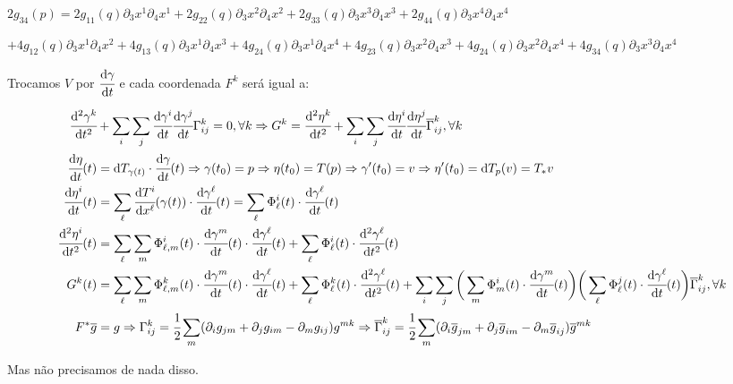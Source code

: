 		$2 g_{34}(p) = 2 g_{11}(q) \partial_3 x^1 \partial_4 x^1 + 2 g_{22}(q) \partial_3 x^2 \partial_4 x^2 + 2 g_{33}(q) \partial_3 x^3 \partial_4 x^3 + 2 g_{44}(q) \partial_3 x^4 \partial_4 x^4$

		$+ 4 g_{12}(q) \partial_3 x^1 \partial_4 x^2 + 4 g_{13}(q) \partial_3 x^1 \partial_4 x^3 + 4 g_{24}(q) \partial_3 x^1 \partial_4 x^4 + 4 g_{23}(q) \partial_3 x^2 \partial_4 x^3 + 4 g_{24}(q) \partial_3 x^2 \partial_4 x^4 + 4 g_{34}(q) \partial_3 x^3 \partial_4 x^4$

		Trocamos $V$ por $\cfrac{\mathrm{d} \gamma}{\mathrm{d} t}$ e cada coordenada $F^k$ ser\'a igual a:

		\begin{align*}
		  \cfrac{\mathrm{d}^2 \gamma^k}{\mathrm{d} t^2} &+ \sum_i \sum_j \cfrac{\mathrm{d} \gamma^i}{\mathrm{d} t} \cfrac{\mathrm{d} \gamma^j}{\mathrm{d} t} \Gamma_{ij}^k = 0, \forall k \Rightarrow G^k = \cfrac{\mathrm{d}^2 \eta^k}{\mathrm{d} t^2} + \sum_i \sum_j \cfrac{\mathrm{d} \eta^i}{\mathrm{d} t} \cfrac{\mathrm{d} \eta^j}{\mathrm{d} t} \overline{\Gamma}_{ij}^k, \forall k \\
		  \cfrac{\mathrm{d} \eta}{\mathrm{d} t} (t) &= \mathrm{d}T_{\gamma(t)} \cdot \cfrac{\mathrm{d} \gamma}{\mathrm{d} t} (t) \Rightarrow \gamma(t_0) = p \Rightarrow \eta(t_0) = T(p) \Rightarrow \gamma'(t_0) = v \Rightarrow \eta'(t_0) = \mathrm{d}T_p (v) = T_* v  \\
		  \cfrac{\mathrm{d} \eta^i}{\mathrm{d} t} (t) &= \sum_\ell \cfrac{\mathrm{d}T^i}{\mathrm{d}x^\ell} (\gamma(t)) \cdot \cfrac{\mathrm{d} \gamma^\ell}{\mathrm{d} t} (t) = \sum_\ell \Phi_\ell^i(t) \cdot \cfrac{\mathrm{d} \gamma^\ell}{\mathrm{d} t} (t) \\
		  \cfrac{\mathrm{d}^2 \eta^i}{\mathrm{d} t^2} (t) &= \sum_\ell \sum_m \Phi_{\ell, m}^i(t) \cdot \cfrac{\mathrm{d} \gamma^m}{\mathrm{d} t} (t) \cdot \cfrac{\mathrm{d} \gamma^\ell}{\mathrm{d} t} (t) + \sum_\ell \Phi_\ell^i(t) \cdot \cfrac{\mathrm{d}^2 \gamma^\ell}{\mathrm{d} t^2} (t) \\
		  G^k(t) &= \sum_\ell \sum_m \Phi_{\ell, m}^k(t) \cdot \cfrac{\mathrm{d} \gamma^m}{\mathrm{d} t} (t) \cdot \cfrac{\mathrm{d} \gamma^\ell}{\mathrm{d} t} (t) + \sum_\ell \Phi_\ell^k(t) \cdot \cfrac{\mathrm{d}^2 \gamma^\ell}{\mathrm{d} t^2} (t) + \sum_i \sum_j \bigg( \sum_m \Phi_m^i(t) \cdot \cfrac{\mathrm{d} \gamma^m}{\mathrm{d} t} (t) \bigg) \bigg( \sum_\ell \Phi_\ell^j(t) \cdot \cfrac{\mathrm{d} \gamma^\ell}{\mathrm{d} t} (t) \bigg) \overline{\Gamma}_{ij}^k, \forall k \\
		  F^* \overline{g} &= g \Rightarrow \Gamma_{ij}^k = \cfrac{1}{2} \sum_m (\partial_i g_{jm} + \partial_j g_{im} - \partial_m g_{ij}) g^{mk} \Rightarrow \overline{\Gamma}_{ij}^k = \cfrac{1}{2} \sum_m (\partial_i \overline{g}_{jm} + \partial_j \overline{g}_{im} - \partial_m \overline{g}_{ij}) \overline{g}^{mk}
		\end{align*}

		Mas n\~ao precisamos de nada disso.
